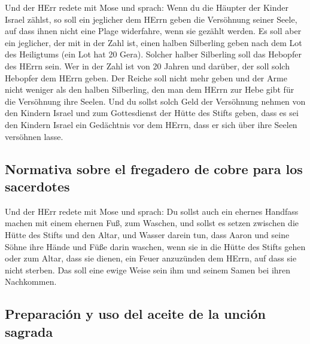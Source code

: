  Und der HErr redete mit Mose und sprach: 
Wenn du die Häupter der Kinder Israel zählst, so soll ein jeglicher dem
HErrn geben die Versöhnung seiner Seele, auf dass ihnen nicht eine Plage
widerfahre, wenn sie gezählt werden.  Es soll aber ein
jeglicher, der mit in der Zahl ist, einen halben Silberling geben nach
dem Lot des Heiligtums (ein Lot hat 20 Gera). Solcher halber Silberling
soll das Hebopfer des HErrn sein.  Wer in der Zahl ist
von 20 Jahren und darüber, der soll solch Hebopfer dem HErrn geben.
 Der Reiche soll nicht mehr geben und der Arme nicht
weniger als den halben Silberling, den man dem HErrn zur Hebe gibt für
die Versöhnung ihre Seelen.  Und du sollst solch Geld der
Versöhnung nehmen von den Kindern Israel und zum Gottesdienst der Hütte
des Stifts geben, dass es sei den Kindern Israel ein Gedächtnis vor dem
HErrn, dass er sich über ihre Seelen versöhnen lasse.

\hypertarget{normativa-sobre-el-fregadero-de-cobre-para-los-sacerdotes}{%
\subsection{Normativa sobre el fregadero de cobre para los
sacerdotes}\label{normativa-sobre-el-fregadero-de-cobre-para-los-sacerdotes}}

 Und der HErr redete mit Mose und sprach: 
Du sollst auch ein ehernes Handfass machen mit einem ehernen Fuß, zum
Waschen, und sollst es setzen zwischen die Hütte des Stifts und den
Altar, und Wasser darein tun,  dass Aaron und seine Söhne
ihre Hände und Füße darin waschen,  wenn sie in die Hütte
des Stifts gehen oder zum Altar, dass sie dienen, ein Feuer anzuzünden
dem HErrn,  auf dass sie nicht sterben. Das soll eine
ewige Weise sein ihm und seinem Samen bei ihren Nachkommen.

\hypertarget{preparaciuxf3n-y-uso-del-aceite-de-la-unciuxf3n-sagrada}{%
\subsection{Preparación y uso del aceite de la unción
sagrada}\label{preparaciuxf3n-y-uso-del-aceite-de-la-unciuxf3n-sagrada}}

